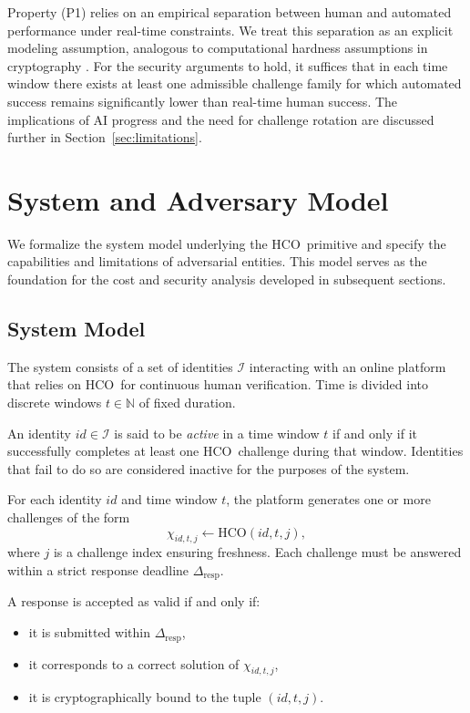 \documentclass[11pt]{article}
\newcommand{\HCO}{HCO\xspace}
\begin{document}
Property (P1) relies on an empirical separation between human and automated performance under real-time constraints. We treat this separation as an explicit modeling assumption, analogous to computational hardness assumptions in cryptography \cite{bellare1993random}. For the security arguments to hold, it suffices that in each time window there exists at least one admissible challenge family for which automated success remains significantly lower than real-time human success. The implications of AI progress and the need for challenge rotation are discussed further in Section~\ref{sec:limitations}.

	
\section{System and Adversary Model}

We formalize the system model underlying the \HCO\ primitive and specify the capabilities and limitations of adversarial entities. This model serves as the foundation for the cost and security analysis developed in subsequent sections.

\subsection{System Model}

The system consists of a set of identities $\mathcal{I}$ interacting with an online platform that relies on \HCO\ for continuous human verification. Time is divided into discrete windows $t \in \mathbb{N}$ of fixed duration.

An identity $id \in \mathcal{I}$ is said to be \emph{active} in a time window $t$ if and only if it successfully completes at least one \HCO\ challenge during that window. Identities that fail to do so are considered inactive for the purposes of the system.

For each identity $id$ and time window $t$, the platform generates one or more challenges of the form
\[
\chi_{id,t,j} \leftarrow \mathrm{HCO}(id, t, j),
\]
where $j$ is a challenge index ensuring freshness. Each challenge must be answered within a strict response deadline $\Delta_{\mathrm{resp}}$.

A response is accepted as valid if and only if:
\begin{itemize}
	\item it is submitted within $\Delta_{\mathrm{resp}}$,
	\item it corresponds to a correct solution of $\chi_{id,t,j}$,
	\item it is cryptographically bound to the tuple $(id, t, j)$.
\end{itemize}
\end{document}
